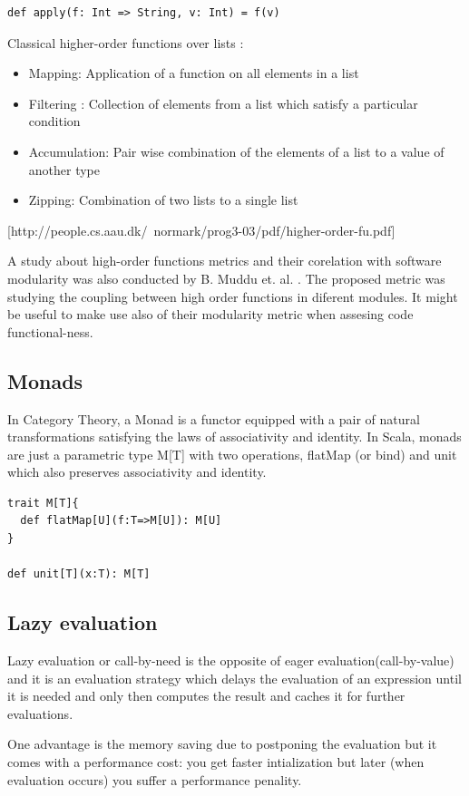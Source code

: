 \documentclass{article}
\begin{document}
\begin{lstlisting} 
def apply(f: Int => String, v: Int) = f(v)
\end{lstlisting} 


Classical higher-order functions over lists :

\begin{itemize}
\item Mapping: Application of a function on all elements in a list
\item Filtering : Collection of elements from a list which satisfy a particular condition
\item Accumulation: Pair wise combination of the elements of a list to a value of
another type
\item Zipping: Combination of two lists to a single list
\end{itemize}
[http://people.cs.aau.dk/~normark/prog3-03/pdf/higher-order-fu.pdf]

A study about high-order functions metrics and their corelation with software modularity was also conducted by B. Muddu et. al. \cite{DBLP:conf/icse/MudduABP13}. The proposed metric was studying the coupling between high order functions in diferent modules. It might be useful to make use also of their modularity metric when assesing code functional-ness.\par 

\subsection {Monads}  \label{monads}
In Category Theory, a Monad is a functor equipped with a pair of natural transformations satisfying the laws of associativity and identity. In Scala, monads are just a parametric type M[T] with two operations, flatMap (or bind) and unit which also preserves associativity and identity. \par

\begin{lstlisting}
trait M[T]{
  def flatMap[U](f:T=>M[U]): M[U]
}

def unit[T](x:T): M[T]
\end{lstlisting}

\subsection {Lazy evaluation}
Lazy evaluation or call-by-need is the opposite of eager evaluation(call-by-value) and it is an evaluation strategy which delays the evaluation of an expression until it is needed and only then computes the result and caches it for further evaluations. \par
One advantage is the memory saving due to postponing the evaluation but it comes with a performance cost: you get faster intialization but later (when evaluation occurs) you suffer a performance penality.\par
\end{document}
